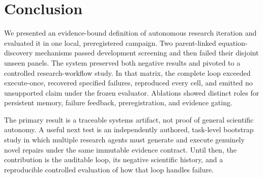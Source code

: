 \section{Conclusion}

We presented an evidence-bound definition of autonomous research iteration
and evaluated it in one local, preregistered campaign. Two parent-linked
equation-discovery mechanisms passed development screening and then failed
their disjoint unseen panels. The system preserved both negative results and
pivoted to a controlled research-workflow study. In that matrix, the complete
loop exceeded execute-once, recovered specified failures, reproduced every
cell, and emitted no unsupported claim under the frozen evaluator. Ablations
showed distinct roles for persistent memory, failure feedback,
preregistration, and evidence gating.

The primary result is a traceable systems artifact, not proof of general
scientific autonomy. A useful next test is an independently authored,
task-level bootstrap study in which multiple research agents must generate
and execute genuinely novel repairs under the same immutable evidence
contract. Until then, the contribution is the auditable loop, its negative
scientific history, and a reproducible controlled evaluation of how that loop
handles failure.
